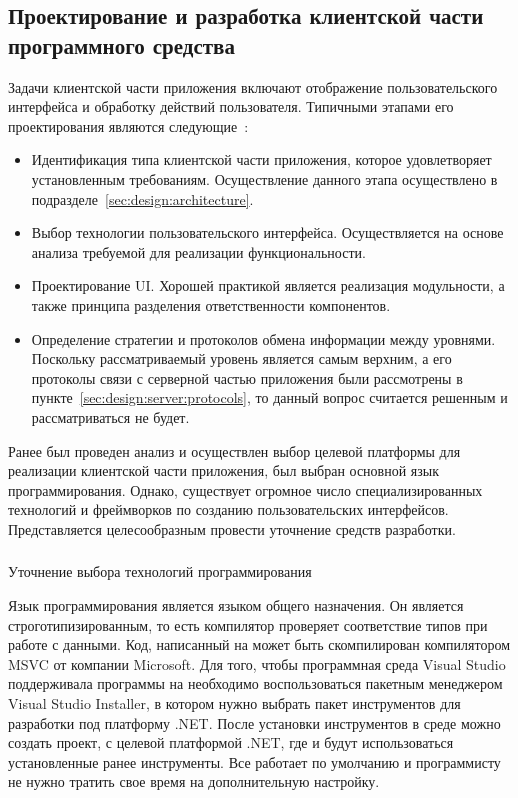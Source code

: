 \subsection{Проектирование и разработка клиентской части программного средства}
\label{sec:design:client}

Задачи клиентской части приложения включают отображение пользовательского интерфейса и обработку действий пользователя. Типичными этапами его проектирования являются следующие~\cite[с.~78]{application_architecture_guide}:

\begin{itemize}
	\item Идентификация типа клиентской части приложения, которое удовлетворяет установленным требованиям. Осуществление данного этапа осуществлено в подразделе~\ref{sec:design:architecture}.
	\item Выбор технологии пользовательского интерфейса. Осуществляется на основе анализа требуемой для реализации функциональности.
	\item Проектирование UI. Хорошей практикой является реализация модульности, а также принципа разделения ответственности компонентов.
	\item Определение стратегии и протоколов обмена информации между уровнями. Поскольку рассматриваемый уровень является самым верхним, а его протоколы связи с серверной частью приложения были рассмотрены в пункте~\ref{sec:design:server:protocols}, то данный вопрос считается решенным и рассматриваться не будет.
\end{itemize}

Ранее был проведен анализ и осуществлен выбор целевой платформы для реализации клиентской части приложения, был выбран основной язык программирования. 
Однако, существует огромное число специализированных технологий и фреймворков по созданию пользовательских интерфейсов. 
Представляется целесообразным провести уточнение средств разработки.

\subsubsection{} Уточнение выбора технологий программирования
\label{sec:design:client:technologies}

Язык программирования \csharp является языком общего назначения. Он является строготипизированным, то есть компилятор проверяет соответствие типов при работе
с данными. Код, написанный на \csharp может быть скомпилирован компилятором MSVC от компании Microsoft. Для того, чтобы программная среда Visual Studio поддерживала
программы на \csharp необходимо воспользоваться пакетным менеджером Visual Studio Installer, в котором нужно выбрать пакет инструментов для разработки под платформу .NET.
После установки инструментов в среде можно создать проект, с целевой платформой .NET, где и будут использоваться установленные ранее инструменты. Все работает по умолчанию и
программисту не нужно тратить свое время на дополнительную настройку.

